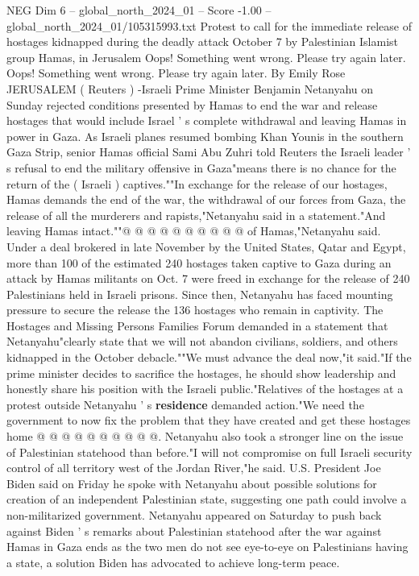 \begin{textsample}{NEG Dim 6 – global\_north\_2024\_01 – Score -1.00 – global\_north\_2024\_01/105315993.txt}  \label{ex:f6_neg_361}
Protest to call for the immediate release of hostages kidnapped during the deadly attack October 7 by Palestinian Islamist group Hamas, in Jerusalem Oops!
Something went wrong.
Please try again later.
Oops!
Something went wrong.
Please try again later.
By Emily Rose JERUSALEM ( Reuters ) -Israeli Prime Minister Benjamin Netanyahu on Sunday rejected conditions presented by Hamas to end the war and release hostages that would include Israel ' s complete withdrawal and leaving Hamas in power in Gaza.
As Israeli planes resumed bombing Khan Younis in the southern Gaza Strip, senior Hamas official Sami Abu Zuhri told Reuters the Israeli leader ' s refusal to end the military offensive in Gaza"means there is no chance for the return of the ( Israeli ) captives.""In exchange for the release of our hostages, Hamas demands the end of the war, the withdrawal of our forces from Gaza, the release of all the murderers and rapists,"Netanyahu said in a statement."And leaving Hamas intact.""@ @ @ @ @ @ @ @ @ @ of Hamas,"Netanyahu said.
Under a deal brokered in late November by the United States, Qatar and Egypt, more than 100 of the estimated 240 hostages taken captive to Gaza during an attack by Hamas militants on Oct. 7 were freed in exchange for the release of 240 Palestinians held in Israeli prisons.
Since then, Netanyahu has faced mounting pressure to secure the release the 136 hostages who remain in captivity.
The Hostages and Missing Persons Families Forum demanded in a statement that Netanyahu"clearly state that we will not abandon civilians, soldiers, and others kidnapped in the October debacle.""We must advance the deal now,"it said."If the prime minister decides to sacrifice the hostages, he should show leadership and honestly share his position with the Israeli public."Relatives of the hostages at a protest outside Netanyahu ' s \textbf{residence} demanded action."We need the government to now fix the problem that they have created and get these hostages home @ @ @ @ @ @ @ @ @ @.
Netanyahu also took a stronger line on the issue of Palestinian statehood than before."I will not compromise on full Israeli security control of all territory west of the Jordan River,"he said.
U.S.
President Joe Biden said on Friday he spoke with Netanyahu about possible solutions for creation of an independent Palestinian state, suggesting one path could involve a non-militarized government.
Netanyahu appeared on Saturday to push back against Biden ' s remarks about Palestinian statehood after the war against Hamas in Gaza ends as the two men do not see eye-to-eye on Palestinians having a state, a solution Biden has advocated to achieve long-term peace.

\end{textsample}
